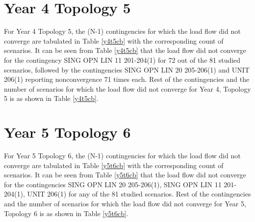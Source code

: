 \documentclass[10pt]{report}
\begin{document}
\section{Year 4 Topology 5}

For Year 4 Topology 5, the (N-1) contingencies for which the load flow did not converge are tabulated in Table \ref{y4t5cb} with the corresponding count of scenarios. It can be seen from Table \ref{y4t5cb} that the load flow did not converge for the contingency SING OPN LIN   11 201-204(1) for 72 out of the 81 studied scenarios, followed by the contingencies SING OPN LIN   20 205-206(1) and UNIT 206(1) reporting nonconvergence 71 times each. Rest of the contingencies and the number of scenarios for which the load flow did not converge for Year 4, Topology 5 is as shown in Table \ref{y4t5cb}.  

\begin{table}[H]
\caption{Count of scenarios for which (N-1) contingencies failed to converge - Year 4, Topology 5}
\label{y4t5cb}
\centering
{}
\end{table}


\section{Year 5 Topology 6}

For Year 5 Topology 6, the (N-1) contingencies for which the load flow did not converge are tabulated in Table \ref{y5t6cb} with the corresponding count of scenarios. It can be seen from Table \ref{y5t6cb} that the load flow did not converge for the contingencies SING OPN LIN   20 205-206(1), SING OPN LIN   11 201-204(1), UNIT 206(1) for any of the 81 studied scenarios. Rest of the contingencies and the number of scenarios for which the load flow did not converge for Year 5, Topology 6 is as shown in Table \ref{y5t6cb}.  
\end{document}
